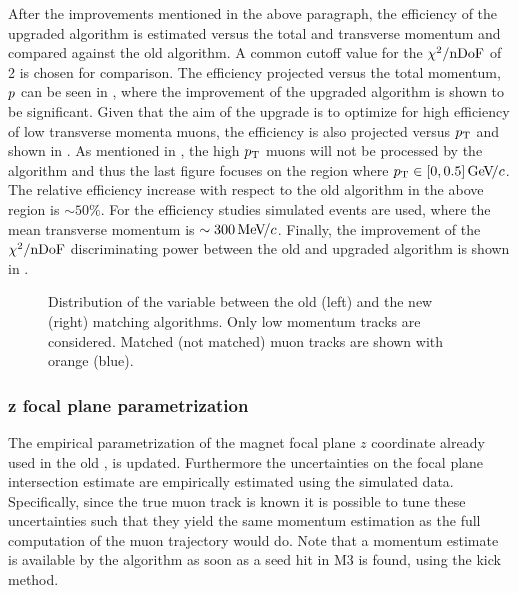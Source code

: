 After the improvements mentioned in the above paragraph, the efficiency of the upgraded \mvTTm algorithm
is estimated versus the total and transverse momentum and compared against the old algorithm. A common cutoff value for
the $\chi^2/\rm nDoF$ of 2 is chosen for comparison. The efficiency projected versus the total momentum, $\mbox{$p$}$
can be seen in , where the improvement of the upgraded \mvTTm algorithm is shown to be significant.
Given that the aim of the \mvTTm upgrade is to optimize for high efficiency of low transverse momenta muons,
the efficiency is also projected versus $\mbox{$p_{\rm T}$}$ and shown in . As mentioned
in , the high $\mbox{$p_{\rm T}$}$ muons will not be processed by the \mvTTm algorithm and thus
the last figure focuses on the region where $\mbox{$p_{\rm T}$}\in[0,0.5]{\mathrm{\,Ge\kern -0.1em V\!/}c}$. The relative efficiency increase with
respect to the old \mvm algorithm in the above region is $\sim 50\%$. For the efficiency studies \Sigmapmumu
simulated events are used, where the mean transverse momentum is $\sim 300{\mathrm{\,Me\kern -0.1em V\!/}c}$. Finally, the improvement
of the $\chi^2/\rm nDoF$ discriminating power between the old and upgraded algorithm is shown in .

\begin{figure}[t]
  \centering
  \begin{subfigure}{0.5\textwidth}
    \raggedright
    \scalebox{.6}{}
    \caption{}
    \label{mvTTm_chi2}
  \end{subfigure}%
  \hfill%
  \begin{subfigure}{0.5\textwidth}
    \raggedleft
    \scalebox{.6}{}
    \caption{}
    \label{mvm_chi2}
  \end{subfigure}
  \caption{Distribution of the \chisq variable between the old (left) and the new (right) matching algorithms.
           Only low momentum \velo tracks are considered. Matched (not matched) muon tracks are shown with orange (blue).}
 \label{mvm_chi2_comp}
\end{figure}

\subsubsection{z focal plane parametrization}
The empirical parametrization of the magnet focal plane $z$ coordinate already used in the old \mvm \cite{roelThesis},
is updated. Furthermore the uncertainties on the focal plane intersection estimate are empirically estimated using the simulated data.
Specifically, since the true muon track is known it is possible to tune these uncertainties such that they yield the same momentum
estimation as the full computation of the muon trajectory would do. Note that a momentum estimate is available by the
\mvTTm algorithm as soon as a seed hit in M3 is found, using the kick method.

